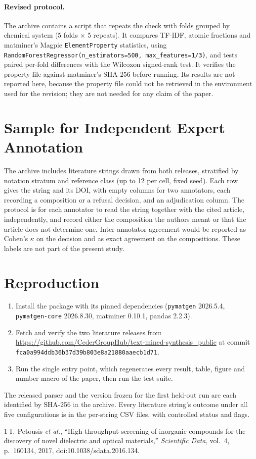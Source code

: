 \documentclass[10pt,a4paper]{article}
\begin{document}
\paragraph{Revised protocol.} The archive contains a script that repeats the check with folds grouped by chemical system (5 folds $\times$ 5 repeats). It compares TF-IDF, atomic fractions and matminer's Magpie \texttt{ElementProperty} statistics, using \texttt{RandomForestRegressor(n\_estimators=500, max\_features=1/3)}, and tests paired per-fold differences with the Wilcoxon signed-rank test. It verifies the property file against matminer's SHA-256 before running. Its results are not reported here, because the property file could not be retrieved in the environment used for the revision; they are not needed for any claim of the paper.

\section{Sample for Independent Expert Annotation}
\label{sec:s6}
The archive includes \NAnnotation{} literature strings drawn from both releases, stratified by notation stratum and reference class (up to 12 per cell, fixed seed). Each row gives the string and its DOI, with empty columns for two annotators, each recording a composition or a refusal decision, and an adjudication column. The protocol is for each annotator to read the string together with the cited article, independently, and record either the composition the authors meant or that the article does not determine one. Inter-annotator agreement would be reported as Cohen's $\kappa$ on the decision and as exact agreement on the compositions. These labels are not part of the present study.

\section{Reproduction}
\label{sec:s7}
\begin{enumerate}
\item Install the package with its pinned dependencies (\texttt{pymatgen} 2026.5.4, \texttt{pymatgen-core} 2026.8.30, matminer 0.10.1, pandas 2.2.3).
\item Fetch and verify the two literature releases from \url{https://github.com/CederGroupHub/text-mined-synthesis_public} at commit \texttt{fca0a994ddb36b37d39b803e8a21880aaecb1d71}.
\item Run the single entry point, which regenerates every result, table, figure and number macro of the paper, then run the test suite.
\end{enumerate}
The released parser and the version frozen for the first held-out run are each identified by SHA-256 in the archive. Every literature string's outcome under all five configurations is in the per-string CSV files, with controlled status and flags.

\begin{thebibliography}{1}
 I.~Petousis \emph{et al.}, ``High-throughput screening of inorganic compounds for the discovery of novel dielectric and optical materials,'' \emph{Scientific Data}, vol.~4, p.~160134, 2017, doi:10.1038/sdata.2016.134.
\end{thebibliography}
\end{document}
